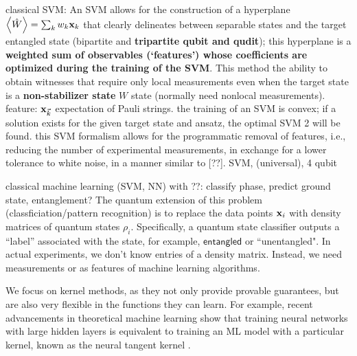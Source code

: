 \documentclass[
aps,
pra,
floatfix,
]{revtex4-2}
\theoremstyle{plain}
\theoremstyle{definition}
\newcommand{\ew}{\hat{W}}
\newcommand{\entangled}{\textsf{entangled}}
\newcommand{\dm}{\rho}
\begin{document}
classical SVM: An SVM allows for the construction of a hyperplane $\expval{\ew}=\sum_k w_k \vbx_{k}$ that clearly delineates between separable states and the target entangled state (bipartite and \textbf{tripartite qubit and qudit}); this hyperplane is a \textbf{weighted sum of observables (`features') whose coefficients are optimized during the training of the SVM}.
This method the ability to obtain witnesses that require only local measurements even when the target state is a \textbf{non-stabilizer state} $W$ state (normally need nonlocal measurements).
feature: $\vb{x}_{\vec{k}}$ expectation of Pauli strings.
the training of an SVM is convex; if a solution exists for the given target state and ansatz, the optimal SVM 2 will be found.
this SVM formalism allows for the programmatic removal of features, i.e., reducing the number of experimental measurements, in exchange for a lower tolerance to white noise, in a manner similar to [??].
SVM, (universal), 4 qubit \cite{vintskevichClassificationFourqubitEntangled2022}

classical machine learning (SVM, NN) with  \cite{huangProvablyEfficientMachine2021}??: classify phase, predict ground state, entanglement?
The quantum extension of this problem (classficiation/pattern recognition) is to replace the data points $\vb{x}_i$ with density matrices of quantum states $\dm_i$. 
Specifically, a quantum state classifier outputs a “label” associated with the state, for example, $\entangled$ or ``unentangled".
In actual experiments, we don't know entries of a density matrix.
Instead, we need measurements or  as features of machine learning algorithms.

We focus on kernel methods, as they not only provide provable guarantees, but are also very flexible in the functions they can learn. For example, recent advancements in theoretical machine learning show that training neural networks with large hidden layers is equivalent to training an ML model with a particular kernel, known as the neural tangent kernel \cite{jacotNeuralTangentKernel2020}.
\end{document}
